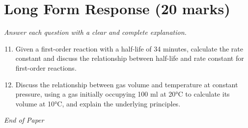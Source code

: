 \documentclass[12pt]{article}
\begin{document}
\section*{Long Form Response (20 marks)}
\textit{Answer each question with a clear and complete explanation.}
\begin{enumerate}[label=\arabic*.]
\setcounter{enumi}{10}
\item Given a first-order reaction with a half-life of 34 minutes, calculate the rate constant
and discuss the relationship between half-life and rate constant for first-order
reactions.
\item Discuss the relationship between gas volume and temperature at constant pressure, using a
gas initially occupying 100 ml at 20°C to calculate its volume at 10°C, and explain the
underlying principles.
\end{enumerate}

\vfill
\noindent\textit{End of Paper}
\end{document}
